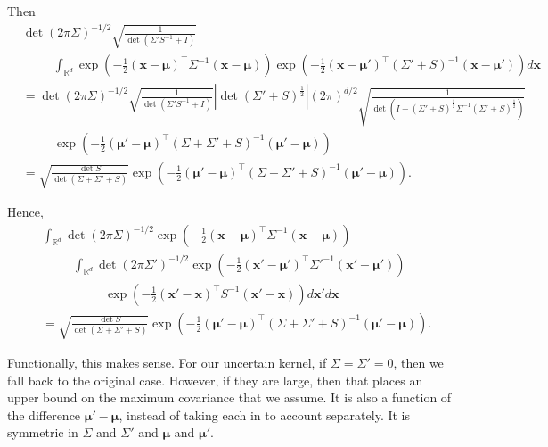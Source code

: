 \documentclass[oneside, 11pt]{article}
\begin{document}
    Then \begin{align*}
        &\det(2\pi\Sigma)^{-1/2} \sqrt{\frac{1}{\det\left(\Sigma'S^{-1} + I\right)}} \\
        &\hspace{30pt}\int_{\mathbb{R}^d} \exp\left(-\frac12 \left(\mathbf{x}-\bm{\mu}\right)^\top \Sigma^{-1} \left(\mathbf{x}-\bm{\mu}\right) \right) \exp\left(-\frac{1}{2}\left(\mathbf{x} - \bm{\mu}'\right)^\top \left(\Sigma' + S\right)^{-1}\left(\mathbf{x} - \bm{\mu}'\right)\right) d\mathbf{x} \\
        &= \det(2\pi\Sigma)^{-1/2} \sqrt{\frac{1}{\det\left(\Sigma'S^{-1} + I\right)}} \left|\det(\Sigma' + S)^{\frac12} \right| (2 \pi)^{d/2} \sqrt{\frac{1}{\det\left(I + \left(\Sigma' + S\right)^{\frac12} \Sigma^{-1} \left(\Sigma' + S\right)^{\frac12}\right)}} \\
        &\hspace{30pt} \exp\left(-\frac{1}{2}\left(\bm{\mu}' - \bm{\mu}\right)^\top \left( \Sigma + \Sigma' + S\right)^{-1}\left(\bm{\mu}' - \bm{\mu}\right)\right) \\
        &= \sqrt{\frac{\det S}{\det\left(\Sigma + \Sigma' + S\right)}} \exp\left(-\frac{1}{2}\left(\bm{\mu}' - \bm{\mu}\right)^\top \left( \Sigma + \Sigma' + S\right)^{-1}\left(\bm{\mu}' - \bm{\mu}\right)\right) \text{.}
    \end{align*}

    Hence,\begin{align*}
        &\int_{\mathbb{R}^d} \det(2\pi\Sigma)^{-1/2} \exp\left(-\frac12 \left(\mathbf{x}-\bm{\mu}\right)^\top \Sigma^{-1} \left(\mathbf{x}-\bm{\mu}\right) \right) \\
        &\hspace{30pt} \int_{\mathbb{R}^d} \det(2\pi\Sigma')^{-1/2} \exp\left(-\frac12 \left(\mathbf{x}'-\bm{\mu}'\right)^\top \Sigma'^{-1} \left(\mathbf{x'}-\bm{\mu}'\right) \right) \\
        &\hspace{60pt}\exp\left(-\frac12 \left(\mathbf{x}'-\mathbf{x}\right)^\top S^{-1} \left(\mathbf{x}'-\mathbf{x}\right) \right) d\mathbf{x}' d\mathbf{x} \\
        &= \sqrt{\frac{\det S}{\det\left(\Sigma + \Sigma' + S\right)}} \exp\left(-\frac{1}{2}\left(\bm{\mu}' - \bm{\mu}\right)^\top \left( \Sigma + \Sigma' + S\right)^{-1}\left(\bm{\mu}' - \bm{\mu}\right)\right) \text{.}
    \end{align*}

    Functionally, this makes sense. For our uncertain kernel, if $\Sigma=\Sigma'=0$, then we fall back to the original case. However, if they are large, then that places an upper bound on the maximum covariance that we assume. It is also a function of the difference $\bm{\mu}' - \bm{\mu}$, instead of taking each in to account separately. It is symmetric in $\Sigma$ and $\Sigma'$ and $\bm{\mu}$ and $\bm{\mu}'$.
\end{document}
